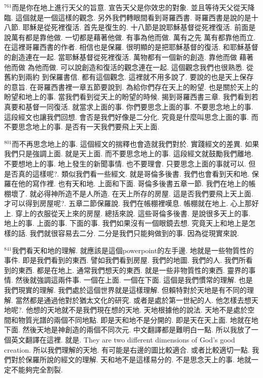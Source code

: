 \documentclass{book}
\begin{document}
$^{761}$而是你在地上進行天父的旨意.
宣告天父是你效忠的對象.
並且等待天父從天降臨.
這個就是一個這樣的觀念.
另外我們轉眼間看到哥羅西書.
哥羅西書是說的是十八節.
耶穌是從死裡復活.
首先是復生的.
十八節是說耶穌基督從死裡復活.
前面是說萬有都是靠他做.
一切都是藉著他做.
有事為他而做.
萬有之先 萬有都靠他而立.
在這裡哥羅西書的作者.
相信也是保羅.
很明顯的是把耶穌基督的復活.
和耶穌基督的創造連在一起.
當耶穌基督從死裡復活.
萬物都有一個新的創造.
靠他而做 藉著他而做 為他而做.
可以說創造和復活的觀念連在一起.
這個觀念我們也很熟悉.
從舊約到兩約 到保羅書信.
都有這個觀念.
這裡就不用多說了.
要說的也是天上保存的意旨.
在哥羅西書裡一章五節要說到.
為給你們存在天上的盼望.
也是關於天上的盼望和地上的事.
當我們看到從天上的盼望的時候.
揭到哥羅西書三章.
我們看到若真要和基督一同復活.
就當求上面的事.
你們要思念上面的事.
不要思念地上的事.
這段經文也讓我們回想.
會否是我們好像是二分化.
究竟是什麼叫思念上面的事.
而不要思念地上的事.
是否有一天我們要飛上天上面.

$^{801}$而不再思念地上的事.
這個經文的揣釋也會造就我們對於.
實踐經文的差異.
如果我們只是強調上面.
就是天上面.
而不要思念地上的事.
這段經文就鼓勵我們離地.
不要想地上的事.
地上發生的新聞事情.
也不要理會.
只要思念上面的事就可以.
但是否真的這樣呢?.
類似我們看一些經文.
就是哥倫多後書.
我們也會看到天和地.
保羅在他的寫作裡.
也有天和地.
上面和下面.
哥倫多後書五章一節.
我們在地上的帳棚壞了.
就必得神所造不是人所造.
在天上所存的房屋.
這是否我們要飛上天上面.
才可以得到房屋呢?.
五章二節保羅說.
我們在帳棚裡嘆息.
帳棚就在地上.
心上那好上.
穿上的衣服從天上來的房屋.
總括來說.
這些哥倫多後書.
是說很多天上的事.
地上的事.
上面的事.
下面的事.
我們如果沒有一個眼鏡去想.
究竟天上和地上是怎樣的話.
我們就很容易去二分.
二分是我們只能夠做到的事.
因為從現實來說.

$^{841}$我們看天和地的理解.
就應該是這個powerpoint的左手邊.
地就是一些物質性的事件.
即是我們看到的東西.
譬如我們看到房屋.
我們的地圖.
我們的人.
我們所看到的東西.
都是在地上.
通常我們想天的東西.
就是一些非物質性的東西.
靈界的事情.
然後就強調這兩件事.
一個在上面.
一個在下面.
這個是我們慣常的理解.
也是我們現實的理解.
我們處於這個世界就是這樣理解.
但賴特對於天地是有不同的理解.
當然都是通過他對於猶太文化的研究.
或者是處於第一世紀的人.
他怎樣去想天地呢?.
他想的天地就不是我們現在想的天地.
天地根據他的說法.
天地不是處於空間和物質光譜的兩個不同地點.
即是天和地不是分開的.
即是天在天上面.
地就在地下面.
然後天地是神創造的兩個不同次元.
中文翻譯都是難明白一點.
所以我放了一個英文翻譯在這裡.
就是.
They are two different dimensions of God's good creation.
所以我們理解的天地.
有可能是右邊的圖比較適合.
或者比較適切一點.
我們對於保羅所說的經文的理解.
天和地不是這樣易分的.
不是思念天上的事.
地就一定不能夠完全割裂.
\end{document}
